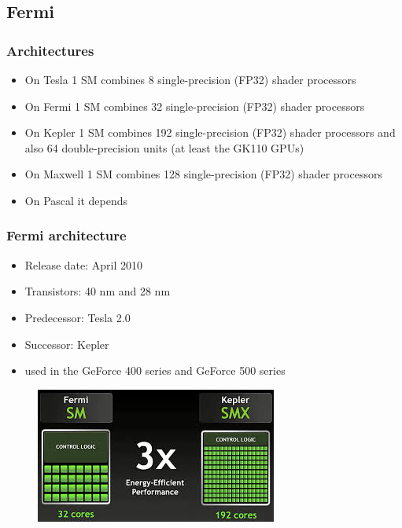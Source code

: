 \documentclass{beamer}
\begin{document}
\subsection{Fermi}

\begin{frame}
\frametitle{Architectures}
\begin{itemize}
	\item {On Tesla 1 SM combines 8 single-precision (FP32) shader processors}
	\item {On Fermi 1 SM combines 32 single-precision (FP32) shader processors}
	\item{On Kepler 1 SM combines 192 single-precision (FP32) shader processors and also 64 double-precision units (at least the GK110 GPUs)}
	\item {On Maxwell 1 SM combines 128 single-precision (FP32) shader processors}
	\item {On Pascal it depends
	}	
\end{itemize}
\end{frame}
\begin{frame}
\frametitle{Fermi architecture}
\begin{itemize}
	\item Release date: April 2010
	\item Transistors: 40 nm and 28 nm
	\item Predecessor: Tesla 2.0
	\item Successor: Kepler
	\item  {used in the GeForce 400 series and GeForce 500 series}

	
\end{itemize}
\begin{figure}
	\centering
	\includegraphics[scale=0.7]{fermi5}
\end{figure}

\end{frame}		
\end{document}
